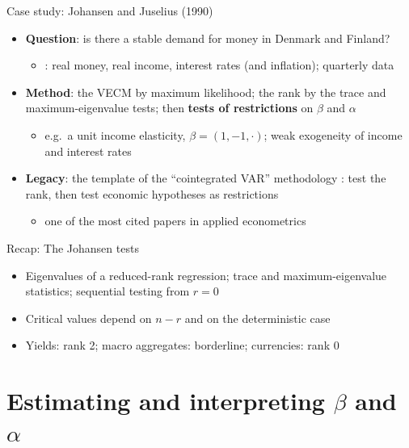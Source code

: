 \begin{frame}{Case study: Johansen and Juselius (1990)}
\itemsize{\small}
\begin{itemize}
    \item \textbf{Question}: is there a stable demand for money in Denmark and Finland?
    \begin{itemize}
        \item {}: real money, real income, interest rates (and inflation); quarterly data
    \end{itemize}
    \item \textbf{Method}: the VECM by maximum likelihood; the rank by the trace and maximum-eigenvalue tests; then \textbf{tests of restrictions} on $\beta$ and $\alpha$
    \begin{itemize}
        \item e.g.\ a unit income elasticity, $\beta = (1, -1, \cdot)$; weak exogeneity of income and interest rates
    \end{itemize}
    \item \textbf{Legacy}: the template of the ``cointegrated VAR'' methodology : test the rank, then test economic hypotheses as restrictions
    \begin{itemize}
        \item one of the most cited papers in applied econometrics
    \end{itemize}
\end{itemize}
\end{frame}

\begin{frame}{Recap: The Johansen tests}
\itemsize{\small}
\begin{itemize}
    \item Eigenvalues of a reduced-rank regression; trace and maximum-eigenvalue statistics; sequential testing from $r = 0$
    \item Critical values depend on $n - r$ and on the deterministic case
    \item Yields: rank 2; macro aggregates: borderline; currencies: rank 0
\end{itemize}
\end{frame}


\section{Estimating and interpreting $\beta$ and $\alpha$}

